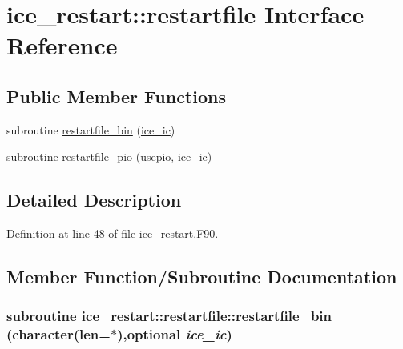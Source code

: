 \hypertarget{interfaceice__restart_1_1restartfile}{
\section{ice\_\-restart::restartfile Interface Reference}
\label{interfaceice__restart_1_1restartfile}
}
\subsection*{Public Member Functions}
\begin{DoxyCompactItemize}
\item 
subroutine \hyperlink{interfaceice__restart_1_1restartfile_a19254384cc26049171d092b1985ed002}{restartfile\_\-bin} (\hyperlink{namespaceice__restart_a7b5bbbfe819de3da4a61882a1c69631d}{ice\_\-ic})
\item 
subroutine \hyperlink{interfaceice__restart_1_1restartfile_a42dfda109a5bae2c4b91a2655ba542e0}{restartfile\_\-pio} (usepio, \hyperlink{namespaceice__restart_a7b5bbbfe819de3da4a61882a1c69631d}{ice\_\-ic})
\end{DoxyCompactItemize}


\subsection{Detailed Description}


Definition at line 48 of file ice\_\-restart.F90.

\subsection{Member Function/Subroutine Documentation}
\hypertarget{interfaceice__restart_1_1restartfile_a19254384cc26049171d092b1985ed002}{
\subsubsection[{restartfile\_\-bin}]{\setlength{\rightskip}{0pt plus 5cm}subroutine ice\_\-restart::restartfile::restartfile\_\-bin (character(len=$\ast$),optional {\em ice\_\-ic})}}
\label{interfaceice__restart_1_1restartfile_a19254384cc26049171d092b1985ed002}


